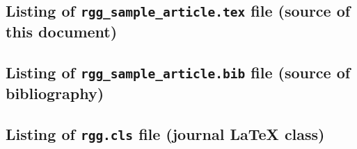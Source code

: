 \documentclass{rgg}
\begin{document}
  \subsection*{Listing of \texttt{rgg\_sample\_article.tex} file
      (source of this document)}
    {\scriptsize}

  \subsection*{Listing of \texttt{rgg\_sample\_article.bib} file 
      (source of bibliography)}
    {\scriptsize}

  \subsection*{Listing of \texttt{rgg.cls} file (journal \LaTeX{} class)}
    {\scriptsize}
\end{document}
